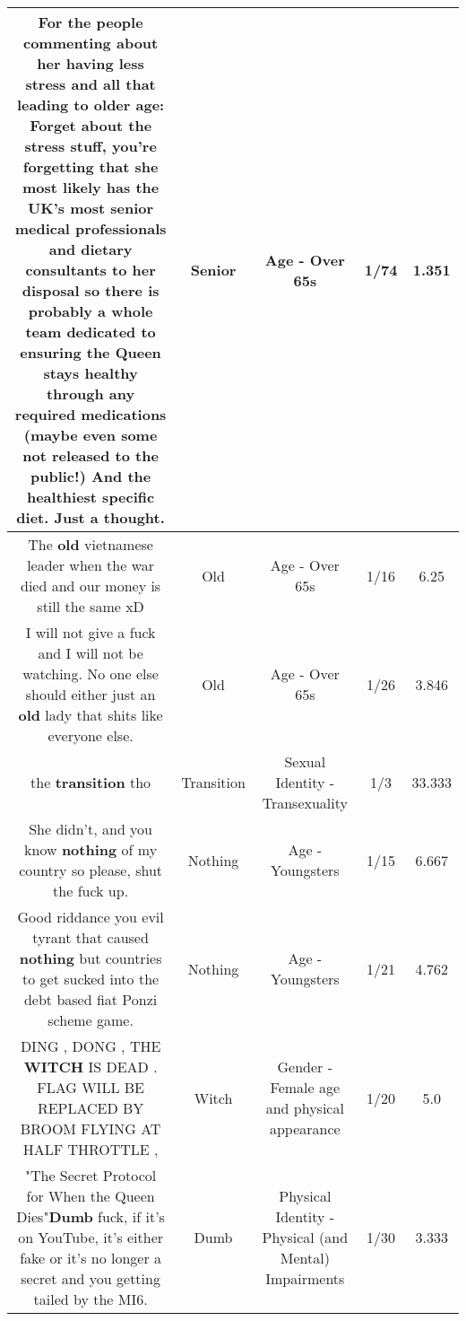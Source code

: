 \documentclass[11pt]{article}
\newlength\mylength
\begin{document}
\begin{center}
\begin{longtable}{|C{.65\mylength}|C{.30\mylength}|C{.12\mylength}|C{.12\mylength}|C{.12\mylength}|}
  \small For the people commenting about her having less stress and all that leading to older age: Forget about the stress stuff, you're forgetting that she most likely has the UK's most \textbf{senior} medical professionals and dietary consultants to her disposal so there is probably a whole team dedicated to ensuring the Queen stays healthy through any required medications (maybe even some not released to the public!) And the healthiest specific diet. Just a thought.\normalsize   & Senior & Age - Over 65s & 1/74 & 1.351 \\  \hline
  \small The \textbf{old} vietnamese leader when the war died and our money is still the same xD\normalsize   & Old & Age - Over 65s & 1/16 & 6.25 \\  \hline
  \small I will not give a fuck and I will not be watching. No one else should either just an \textbf{old} lady that shits like everyone else.\normalsize   & Old & Age - Over 65s & 1/26 & 3.846 \\  \hline
  \small the \textbf{transition} tho\normalsize   & Transition & Sexual Identity - Transexuality & 1/3 & 33.333 \\  \hline
  \small She didn't, and you know \textbf{nothing} of my country so please, shut the fuck up.\normalsize   & Nothing & Age - Youngsters & 1/15 & 6.667 \\  \hline
  \small Good riddance you evil tyrant that caused \textbf{nothing} but countries to get sucked into the debt based fiat Ponzi scheme game.\normalsize   & Nothing & Age - Youngsters & 1/21 & 4.762 \\  \hline
  \small DING , DONG , THE \textbf{WITCH} IS DEAD .  FLAG WILL BE REPLACED BY BROOM FLYING AT HALF THROTTLE ,\normalsize   & Witch & Gender - Female age and physical appearance & 1/20 & 5.0 \\  \hline
  \small "The Secret Protocol for When the Queen Dies"\textbf{Dumb} fuck, if it's on YouTube, it's either fake or it's no longer a secret and you getting tailed by the MI6.\normalsize   & Dumb & Physical Identity - Physical (and Mental) Impairments & 1/30 & 3.333 \\  \hline

\end{longtable}
\end{center}
\end{document}

